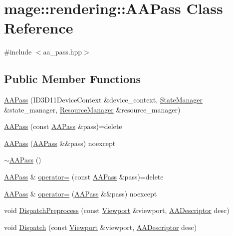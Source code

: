 \hypertarget{classmage_1_1rendering_1_1_a_a_pass}{}\section{mage\+:\+:rendering\+:\+:A\+A\+Pass Class Reference}
\label{classmage_1_1rendering_1_1_a_a_pass}


{\ttfamily \#include $<$aa\+\_\+pass.\+hpp$>$}

\subsection*{Public Member Functions}
\begin{DoxyCompactItemize}
\item 
\hyperlink{classmage_1_1rendering_1_1_a_a_pass_a691e1f111a4a28b0b734018551c6f418}{A\+A\+Pass} (I\+D3\+D11\+Device\+Context \&device\+\_\+context, \hyperlink{classmage_1_1rendering_1_1_state_manager}{State\+Manager} \&state\+\_\+manager, \hyperlink{classmage_1_1rendering_1_1_resource_manager}{Resource\+Manager} \&resource\+\_\+manager)
\item 
\hyperlink{classmage_1_1rendering_1_1_a_a_pass_a55fb8bc231b3b930221136549f364b9b}{A\+A\+Pass} (const \hyperlink{classmage_1_1rendering_1_1_a_a_pass}{A\+A\+Pass} \&pass)=delete
\item 
\hyperlink{classmage_1_1rendering_1_1_a_a_pass_a74bdde31126a57fd49c73811f5a20e6e}{A\+A\+Pass} (\hyperlink{classmage_1_1rendering_1_1_a_a_pass}{A\+A\+Pass} \&\&pass) noexcept
\item 
\hyperlink{classmage_1_1rendering_1_1_a_a_pass_a389948121a48218eee21292db38559fd}{$\sim$\+A\+A\+Pass} ()
\item 
\hyperlink{classmage_1_1rendering_1_1_a_a_pass}{A\+A\+Pass} \& \hyperlink{classmage_1_1rendering_1_1_a_a_pass_a3829af3d6483e04c7d7c9dcabf2b8674}{operator=} (const \hyperlink{classmage_1_1rendering_1_1_a_a_pass}{A\+A\+Pass} \&pass)=delete
\item 
\hyperlink{classmage_1_1rendering_1_1_a_a_pass}{A\+A\+Pass} \& \hyperlink{classmage_1_1rendering_1_1_a_a_pass_a49e56b2a51acc9c99be91960a846f155}{operator=} (\hyperlink{classmage_1_1rendering_1_1_a_a_pass}{A\+A\+Pass} \&\&pass) noexcept
\item 
void \hyperlink{classmage_1_1rendering_1_1_a_a_pass_a7ad7e4a2beba976635b9c84d0f765406}{Dispatch\+Preprocess} (const \hyperlink{classmage_1_1rendering_1_1_viewport}{Viewport} \&viewport, \hyperlink{namespacemage_1_1rendering_a25c189fd1da946d7a8f0abdd4f0e6afa}{A\+A\+Descriptor} desc)
\item 
void \hyperlink{classmage_1_1rendering_1_1_a_a_pass_afea7d676d1c0f16f9a11c1ac2455bbb3}{Dispatch} (const \hyperlink{classmage_1_1rendering_1_1_viewport}{Viewport} \&viewport, \hyperlink{namespacemage_1_1rendering_a25c189fd1da946d7a8f0abdd4f0e6afa}{A\+A\+Descriptor} desc)
\end{DoxyCompactItemize}
